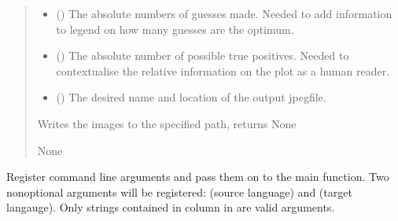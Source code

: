 \documentclass[letterpaper,10pt,english]{sphinxmanual}
\begin{document}
\begin{fulllineitems}
\begin{quote}
\begin{description}
\begin{itemize}
\item {} 
\sphinxAtStartPar
{} () \textendash{} The absolute numbers of guesses made. Needed to add
information to legend on how many guesses are the optimum.

\item {} 
\sphinxAtStartPar
{} () \textendash{} The absolute number of possible true positives. Needed to
contextualise the relative information on the plot as a
human reader.

\item {} 
\sphinxAtStartPar
{} () \textendash{} The desired name and location of the output jpeg\sphinxhyphen{}file.

\end{itemize}

\sphinxAtStartPar
Writes the images to the specified path, returns None

\sphinxAtStartPar
None

\end{description}\end{quote}

\end{fulllineitems}


\begin{fulllineitems}
\label{\detokenize{mkloanpy:ronataswestoldturkiccommands.plot_eval.register}}
\pysigstartsignatures
{}
\pysigstopsignatures
\sphinxAtStartPar
Register command line arguments and pass them on to the main function.
Two non\sphinxhyphen{}optional arguments will be registered:
 (source language) and  (target langauge).
Only strings contained in column  in  are valid
arguments.

\end{fulllineitems}
\end{document}
